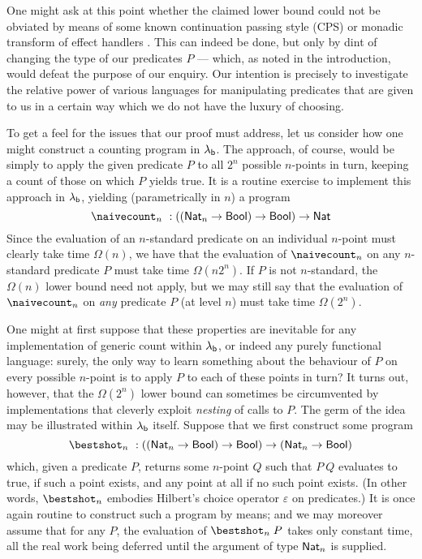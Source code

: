 \documentclass[12pt,phd,lfcs,twoside,openright,logo,leftchapter,normalheadings]{infthesis}
\theoremstyle{plain}
\theoremstyle{definition}
\begin{document}
One might ask at this point whether the claimed lower bound could not
be obviated by means of some known continuation passing style (CPS) or
monadic transform of effect handlers
\cite{HillerstromLAS17,Leijen17}. This can indeed be done, but only by
dint of changing the type of our predicates $P$ --- which, as noted in
the introduction, would defeat the purpose of our enquiry.
Our intention is precisely to investigate the relative power of various
languages for manipulating predicates that are given to us in a
certain way which we do not have the luxury of choosing.

To get a feel for the issues that our proof must address, let us
consider how one might construct a counting program in
$\lambda_{\mathsf{b}}$.  The \naive approach, of course, would be simply to apply the
given predicate $P$ to all $2^n$ possible $n$-points in turn, keeping
a count of those on which $P$ yields true.  It is a routine exercise to
implement this approach in $\lambda_{\mathsf{b}}$, yielding (parametrically in $n$)
a program
%
{
\[
  \naivecount_n ~: ((\Nat_n \to \Bool) \to \Bool) \to \Nat
\]}%
%
Since the evaluation of an $n$-standard predicate on an individual
$n$-point must clearly take time $\Omega(n)$, we have that the
evaluation of $\naivecount_n$ on any $n$-standard predicate $P$ must
take time $\Omega(n2^n)$. If $P$ is not $n$-standard, the $\Omega(n)$
lower bound need not apply, but we may still say that the evaluation
of $\naivecount_n$ on \emph{any} predicate $P$ (at level $n$) must
take time $\Omega(2^n)$.

One might at first suppose that these properties are inevitable for
any implementation of generic count within $\lambda_{\mathsf{b}}$, or indeed any
purely functional language: surely, the only way to learn something
about the behaviour of $P$ on every possible $n$-point is to apply $P$
to each of these points in turn?  It turns out, however, that the
$\Omega(2^n)$ lower bound can sometimes be circumvented by
implementations that cleverly exploit \emph{nesting} of calls to $P$.
%
The germ of the idea may be illustrated within $\lambda_{\mathsf{b}}$ itself.
Suppose that we first construct some program
%
{
\[
  \bestshot_n ~: ((\Nat_n \to \Bool) \to \Bool) \to (\Nat_n \to \Bool)
\]}%
%
which, given a predicate $P$, returns some $n$-point $Q$ such that
$P~Q$ evaluates to true, if such a point exists, and any point at all
if no such point exists.
%
(In other words, $\bestshot_n$ embodies Hilbert's choice operator
$\varepsilon$ on predicates.)
%
It is once again routine to construct such a program by \naive means;
and we may moreover assume that for any $P$, the evaluation of
$\bestshot_n\;P$ takes only constant time, all the real work being
deferred until the argument of type $\mathsf{Nat}_n$ is supplied.
\end{document}
